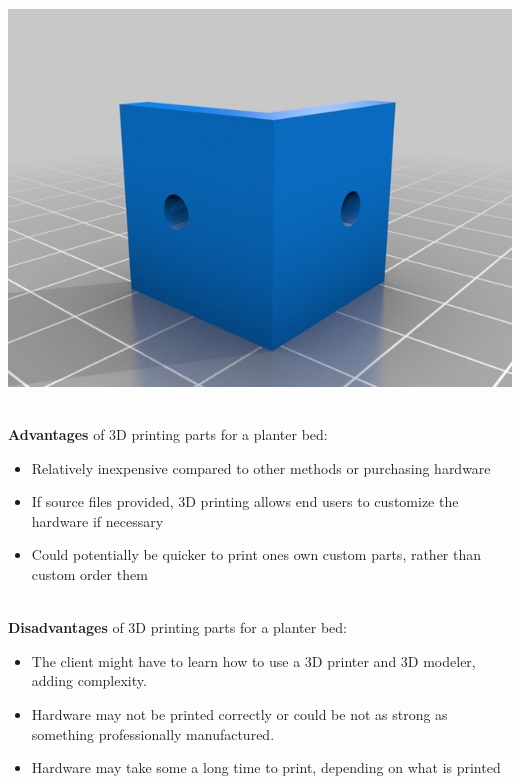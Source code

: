\documentclass[onecolumn, draftclsnofoot,10pt, compsoc]{IEEEtran}
\begin{document}
		\begin{center}
			\includegraphics[scale=0.5]{90-degree-bracket.jpg}
		\end{center} \cite{IMG3}

		\noindent \\ \textbf{Advantages} of 3D printing parts for a planter bed:
		\begin{itemize}
			\item Relatively inexpensive compared to other methods or purchasing hardware
			\item If source files provided, 3D printing allows end users to customize the hardware if necessary
			\item Could potentially be quicker to print ones own custom parts, rather than custom order them
		\end{itemize}

		\noindent \\ \textbf{Disadvantages} of 3D printing parts for a planter bed:
		\begin{itemize}
			\item The client might have to learn how to use a 3D printer and 3D modeler, adding complexity.
			\item Hardware may not be printed correctly or could be not as strong as something professionally manufactured.
			\item Hardware may take some a long time to print, depending on what is printed
		\end{itemize}

		\newpage %
\end{document}
